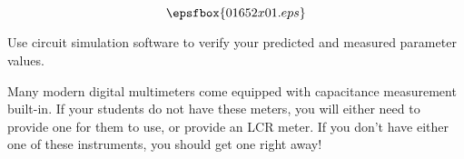 

$$\epsfbox{01652x01.eps}$$

\vfil \eject






Use circuit simulation software to verify your predicted and measured parameter values.







Many modern digital multimeters come equipped with capacitance measurement built-in.  If your students do not have these meters, you will either need to provide one for them to use, or provide an LCR meter.  If you don't have either one of these instruments, you should get one right away!




